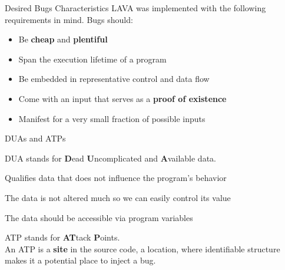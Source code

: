 \documentclass[aspectratio=169]{beamer}
\begin{document}
  \begin{frame}{Desired Bugs Characteristics}
    LAVA was implemented with the following requirements in mind. Bugs should:
    \begin{itemize}
    \setlength\itemsep{1em}
    \item[\textcolor{custom-green}{\ding{51}}] Be \textbf{cheap} and \textbf{plentiful}
    \item[\textcolor{custom-green}{\ding{51}}] Span the execution lifetime of a program
    \item[\textcolor{custom-green}{\ding{51}}] Be embedded in representative control and data flow
    \item[\textcolor{custom-green}{\ding{51}}] Come with an input that serves as a \textbf{proof of existence}
    \item[\textcolor{custom-green}{\ding{51}}] Manifest for a very small fraction of possible inputs
    \end{itemize}
  \end{frame}

  \begin{frame}{DUAs and ATPs}
    \vspace{0.5em}
    \begin{definition}
      \vspace{0.3em}
      \textcolor{mLightGreen}{DUA} stands for \textbf{D}ead \textbf{U}ncomplicated and \textbf{A}vailable data.\\
      \vspace{-0.2em}
      \begin{description}[Uncomplicated]
        \item[Dead] Qualifies data that does \alert{not influence the program's behavior}
        \item[Uncomplicated] The data is \alert{not altered much} so we can easily control its value 
        \item[Available] The data should be \alert{accessible} via program variables
      \end{description}
    \end{definition}
    \pause
    \begin{definition}
      \vspace{0.3em}
      \textcolor{mLightGreen}{ATP} stands for \textbf{AT}tack \textbf{P}oints.\\
      \vspace{0.3em}
      An ATP is a \textbf{site} in the source code, a location, where identifiable structure makes it a \alert{potential place to inject a bug}.
    \end{definition}
  \end{frame}
\end{document}
